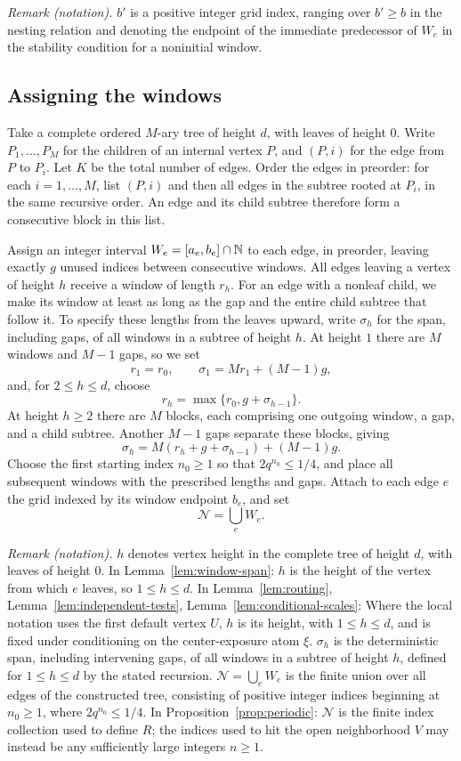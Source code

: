 \noindent\textit{Remark (notation).} $b'$ is a positive integer grid index, ranging over $b'\ge b$ in the nesting relation and denoting the endpoint of the immediate predecessor of $W_e$ in the stability condition for a noninitial window.


\subsection*{Assigning the windows}

Take a complete ordered $M$-ary tree of height $d$, with leaves of height
$0$.  Write $P_1,\ldots,P_M$ for the children of an internal vertex $P$,
and $(P,i)$ for the edge from $P$ to $P_i$.  Let $K$ be the total number
of edges.  Order the edges in preorder: for each $i=1,\ldots,M$, list
$(P,i)$ and then all edges in the subtree rooted at $P_i$, in the same
recursive order.  An edge and its child subtree therefore form a
consecutive block in this list.

Assign an integer interval $W_e=[a_e,b_e]\cap\mathbb N$ to each edge, in
preorder, leaving exactly $g$ unused indices between consecutive
windows.  All edges leaving a vertex of height $h$ receive a window of
length $r_h$.  For an edge with a nonleaf child, we make its window at
least as long as the gap and the entire child subtree that follow it.
To specify these lengths from the leaves upward, write $\sigma_h$ for
the span, including gaps, of all windows in a subtree of height $h$.
At height $1$ there are $M$ windows and $M-1$ gaps, so we set
\[
 r_1=r_0,\qquad \sigma_1=Mr_1+(M-1)g,
\]
and, for $2\le h\le d$, choose
\[
 r_h=\max\{r_0,g+\sigma_{h-1}\}.
\]
At height $h\ge2$ there are $M$ blocks, each comprising one outgoing
window, a gap, and a child subtree.  Another $M-1$ gaps separate these
blocks, giving
\[
 \sigma_h=M(r_h+g+\sigma_{h-1})+(M-1)g.
\]
Choose the first starting index $n_0\ge1$ so that
$2q^{n_0}\le1/4$, and place all subsequent windows with the prescribed
lengths and gaps.  Attach to each edge $e$ the grid indexed by its window
endpoint $b_e$, and set
\[
 \mathcal N=\bigcup_e W_e.
\]

\noindent\textit{Remark (notation).} $h$ denotes vertex height in the complete tree of height $d$, with leaves of height $0$. In Lemma~\ref{lem:window-span}: $h$ is the height of the vertex from which $e$ leaves, so $1\le h\le d$. In Lemma~\ref{lem:routing}, Lemma~\ref{lem:independent-tests}, Lemma~\ref{lem:conditional-scales}: Where the local notation uses the first default vertex $U$, $h$ is its height, with $1\le h\le d$, and is fixed under conditioning on the center-exposure atom $\xi$. $\sigma_h$ is the deterministic span, including intervening gaps, of all windows in a subtree of height $h$, defined for $1\le h\le d$ by the stated recursion. $\mathcal N=\bigcup_e W_e$ is the finite union over all edges of the constructed tree, consisting of positive integer indices beginning at $n_0\ge1$, where $2q^{n_0}\le1/4$. In Proposition~\ref{prop:periodic}: $\mathcal N$ is the finite index collection used to define $R$; the indices used to hit the open neighborhood $V$ may instead be any sufficiently large integers $n\ge1$.


